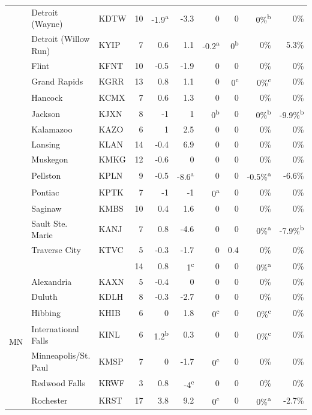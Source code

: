 \documentclass[twocol]{ametsoc}
\begin{document}
\begin{landscape}
\begin{table}[]
\begin{tabular}{@{}cllrrrrrrr@{}}
 & Detroit (Wayne) & KDTW & 10 & -1.9\textsuperscript{a} & -3.3 & 0 & 0 & 0\%\textsuperscript{b} & 0\% \\
 & Detroit (Willow Run) & KYIP & 7 & 0.6 & 1.1 & -0.2\textsuperscript{a} & 0\textsuperscript{b} & 0\% & 5.3\% \\
 & Flint & KFNT & 10 & -0.5 & -1.9 & 0 & 0 & 0\% & 0\% \\
 & Grand Rapids & KGRR & 13 & 0.8 & 1.1 & 0 & 0\textsuperscript{c} & 0\%\textsuperscript{c} & 0\% \\
 & Hancock & KCMX & 7 & 0.6 & 1.3 & 0 & 0 & 0\% & 0\% \\
 & Jackson & KJXN & 8 & -1 & 1 & 0\textsuperscript{b} & 0 & 0\%\textsuperscript{b} & -9.9\%\textsuperscript{b} \\
 & Kalamazoo & KAZO & 6 & 1 & 2.5 & 0 & 0 & 0\% & 0\% \\
 & Lansing & KLAN & 14 & -0.4 & 6.9 & 0 & 0 & 0\% & 0\% \\
 & Muskegon & KMKG & 12 & -0.6 & 0 & 0 & 0 & 0\% & 0\% \\
 & Pellston & KPLN & 9 & -0.5 & -8.6\textsuperscript{a} & 0 & 0 & -0.5\%\textsuperscript{a} & -6.6\% \\
 & Pontiac & KPTK & 7 & -1 & -1 & 0\textsuperscript{a} & 0 & 0\% & 0\% \\
 & Saginaw & KMBS & 10 & 0.4 & 1.6 & 0 & 0 & 0\% & 0\% \\
 & Sault Ste. Marie & KANJ & 7 & 0.8 & -4.6 & 0 & 0 & 0\%\textsuperscript{a} & -7.9\%\textsuperscript{b} \\
 & Traverse City & KTVC & 5 & -0.3 & -1.7 & 0 & 0.4 & 0\% & 0\% \\ \cmidrule(l){2-10} 
 &  &  & 14 & 0.8 & 1\textsuperscript{c} & 0 & 0 & 0\%\textsuperscript{a} & 0\% \\ \midrule
\multirow{8}{*}{MN} & Alexandria & KAXN & 5 & -0.4 & 0 & 0 & 0 & 0\% & 0\% \\
 & Duluth & KDLH & 8 & -0.3 & -2.7 & 0 & 0 & 0\% & 0\% \\
 & Hibbing & KHIB & 6 & 0 & 1.8 & 0\textsuperscript{c} & 0 & 0\%\textsuperscript{c} & 0\% \\
 & International Falls & KINL & 6 & 1.2\textsuperscript{b} & 0.3 & 0 & 0 & 0\%\textsuperscript{c} & 0\% \\
 & Minneapolis/St. Paul & KMSP & 7 & 0 & -1.7 & 0\textsuperscript{c} & 0 & 0\% & 0\% \\
 & Redwood Falls & KRWF & 3 & 0.8 & -4\textsuperscript{c} & 0 & 0 & 0\% & 0\% \\
 & Rochester & KRST & 17 & 3.8 & 9.2 & 0\textsuperscript{c} & 0 & 0\%\textsuperscript{a} & -2.7\% \\ \cmidrule(l){2-10} 

\end{tabular}
\end{table}
\end{landscape}
\end{document}
